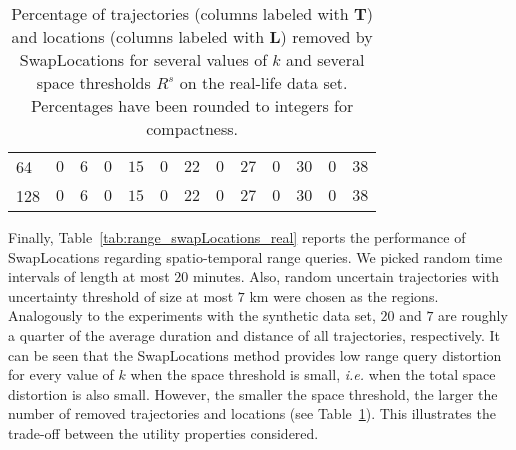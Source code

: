 \begin{table}[p]
\begin{tabular}{ @{} l c c c c c c c c c c c c @{}}
64	&	$0$	&	$6$	&	$0$	&	$15$	&	$0$	&	$22$	&	$0$	&	$27$	&	$0$	&	 $30$	 &	 $0$	&	 $38$	\\\cmidrule(l){2-13}
				
 128 &	$0$	&	$6$	&	$0$	&	$15$	&	$0$	&	$22$	&	$0$	&	$27$	&	$0$	&	 $30$	 &	 $0$	&	 $38$	\\\bottomrule
				
\end{tabular}
\caption{Percentage of trajectories (columns labeled with \textbf{T}) and
locations (columns labeled with \textbf{L}) removed by SwapLocations
for several values of $k$ and several space thresholds $R^s$
on the real-life data set.
Percentages have been rounded to integers for compactness.
\label{tab:swapLocations2}}
\end{table}

Finally, Table~\ref{tab:range_swapLocations_real} reports
the performance of SwapLocations regarding spatio-temporal range queries.
We picked random time intervals of length at most $20$ minutes. Also,
random uncertain trajectories with uncertainty threshold of
size at most $7$ km were chosen as the regions.
Analogously to the experiments with the synthetic data set,
$20$ and $7$ are roughly a quarter of the average duration and distance
of all trajectories, respectively. It can be seen
that the SwapLocations method provides low range query distortion
for every value of $k$ when the space threshold is small, \emph{i.e.}
when the total space distortion is also small. However, the smaller
the space threshold, the larger the number of removed trajectories and
locations (see Table~\ref{tab:swapLocations2}). This illustrates
the trade-off between the utility properties considered.

